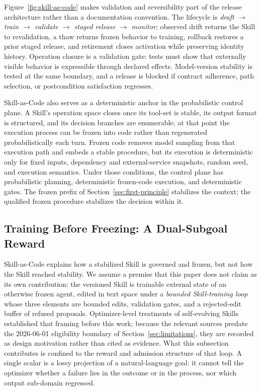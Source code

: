 \documentclass[11pt]{article}
\begin{document}
Figure~\ref{fig:skill-as-code} makes validation and reversibility part of the release architecture rather than a documentation convention. The lifecycle is \textit{draft $\rightarrow$ train $\rightarrow$ validate $\rightarrow$ staged release $\rightarrow$ monitor}; observed drift returns the Skill to revalidation, a thaw returns frozen behavior to training, rollback restores a prior staged release, and retirement closes activation while preserving identity history. Operation closure is a validation gate: tests must show that externally visible behavior is expressible through declared effects. Model-version stability is tested at the same boundary, and a release is blocked if contract adherence, path selection, or postcondition satisfaction regresses.

Skill-as-Code also serves as a deterministic anchor in the probabilistic control plane. A Skill's operation space closes once its tool-set is stable, its output format is structured, and its decision branches are enumerable; at that point the execution process can be frozen into code rather than regenerated probabilistically each turn. Frozen code removes model sampling from that execution path and embeds a stable procedure, but its execution is deterministic only for fixed inputs, dependency and external-service snapshots, random seed, and execution semantics. Under those conditions, the control plane has probabilistic planning, deterministic frozen-code execution, and deterministic gates. The frozen prefix of Section~\ref{sec:first-principle} stabilizes the context; the qualified frozen procedure stabilizes the decision within it.

\subsection{Training Before Freezing: A Dual-Subgoal Reward}
\label{sec:training-before-freezing}

Skill-as-Code explains how a stabilized Skill is governed and frozen, but not how the Skill reached stability. We assume a premise that this paper does not claim as its own contribution: the versioned Skill is trainable external state of an otherwise frozen agent, edited in text space under a \textit{bounded Skill-training loop} whose three elements are bounded edits, validation gates, and a rejected-edit buffer of refused proposals. Optimizer-level treatments of self-evolving Skills established that framing before this work; because the relevant sources predate the 2026-06-01 eligibility boundary of Section~\ref{sec:limitations}, they are recorded as design motivation rather than cited as evidence. What this subsection contributes is confined to the reward and admission structure of that loop. A single scalar is a lossy projection of a natural-language goal: it cannot tell the optimizer whether a failure lies in the outcome or in the process, nor which output sub-domain regressed.
\end{document}
